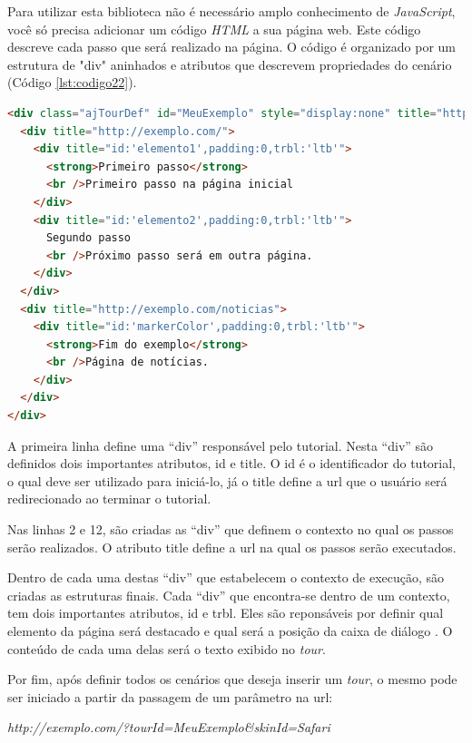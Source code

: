 Para utilizar esta biblioteca não é necessário amplo conhecimento de \textit{JavaScript}, você só precisa adicionar um código \textit{HTML} a sua página web. Este código descreve cada passo que será realizado na página. O código é organizado por um estrutura de "div" aninhados e atributos que descrevem propriedades do cenário (Código \ref{lst:codigo22}).

{\singlespace
\begin{lstlisting}[caption=Estrutura do código \textit{HTML} do \textit{Amberjack},language=HTML,label={lst:codigo23}]
<div class="ajTourDef" id="MeuExemplo" style="display:none" title="http://feedback.exemplo.com/">
  <div title="http://exemplo.com/">
    <div title="id:'elemento1',padding:0,trbl:'ltb'">
      <strong>Primeiro passo</strong>
      <br />Primeiro passo na página inicial
    </div>
    <div title="id:'elemento2',padding:0,trbl:'ltb'">
      Segundo passo
      <br />Próximo passo será em outra página.
    </div>
  </div>
  <div title="http://exemplo.com/noticias">
    <div title="id:'markerColor',padding:0,trbl:'ltb'">
      <strong>Fim do exemplo</strong>
      <br />Página de notícias.
    </div>
  </div>
</div>
\end{lstlisting}
}

A primeira linha define uma ``div'' responsável pelo tutorial. Nesta ``div'' são definidos dois importantes atributos, id e title. O id é o identificador do tutorial, o qual deve ser utilizado para iniciá-lo, já o title define a url que o usuário será redirecionado ao terminar o tutorial.

Nas linhas 2 e 12, são criadas as ``div'' que definem o contexto no qual os passos serão realizados. O atributo title define a url na qual os passos serão executados.

Dentro de cada uma destas ``div'' que estabelecem o contexto de execução, são criadas as estruturas finais. Cada ``div'' que encontra-se dentro de um contexto, tem dois importantes atributos, id e trbl. Eles são reponsáveis por definir qual elemento da página será destacado e qual será a posição da caixa de diálogo \cite{AJ}. O conteúdo de cada uma delas será o texto exibido no \textit{tour}.

Por fim, após definir todos os cenários que deseja inserir um \textit{tour}, o mesmo pode ser iniciado a partir da passagem de um parâmetro na url:

\begin{center}
\textit{http://exemplo.com/?tourId=MeuExemplo\&skinId=Safari}
\end{center}







